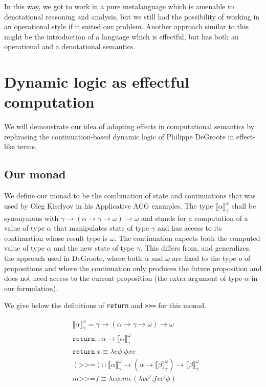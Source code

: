\documentclass{article}
\newcommand{\hsbind}{\mathbin{\texttt{>>=}}}
\newcommand{\statecps}[3]{\llbracket #3 \rrbracket^{#2}_{#1}}
\begin{document}
In this way, we got to work in a pure metalanguage which is amenable to
denotational reasoning and analysis, but we still had the possibility of
working in an operational style if it suited our problem. Another approach
similar to this might be the introduction of a language which is effectful,
but has both an operational and a denotational semantics.


\section{Dynamic logic as effectful computation}

We will demonstrate our idea of adopting effects in computational semantics by
rephrasing the continuation-based dynamic logic of Philippe DeGroote in
effect-like terms.


\subsection{Our monad}

We define our monad to be the combination of state and continuations that was
used by Oleg Kiselyov in his Applicative ACG examples. The type
$\statecps{\gamma}{\omega}{\alpha}$ shall be synonymous with $\gamma \to
(\alpha \to \gamma \to \omega) \to \omega$ and stands for a computation of a
value of type $\alpha$ that manipulates state of type $\gamma$ and has access
to its continuation whose result type is $\omega$. The continuation expects
both the computed value of type $\alpha$ and the new state of type
$\gamma$. This differs from, and generalizes, the approach used in DeGroote,
where both $\alpha$ and $\omega$ are fixed to the type $o$ of propositions and
where the continuation only produces the future proposition and does not need
access to the current proposition (the extra argument of type $\alpha$ in our
formulation).

We give below the definitions of \texttt{return} and \texttt{>>=} for this
monad.

\begin{align*}
& \statecps{\gamma}{\omega}{\alpha} = \gamma \to (\alpha \to \gamma \to \omega) \to \omega \\
& \texttt{return} :: \alpha \to \statecps{\gamma}{\omega}{\alpha} \\
& \texttt{return}\ x \equiv \lambda e \phi. \phi x e \\
& (\texttt{>>=}) :: \statecps{\gamma}{\omega}{\alpha}
    \to (\alpha \to \statecps{\gamma}{\omega}{\beta})
     \to \statecps{\gamma}{\omega}{\beta} \\
& m \hsbind f \equiv \lambda e \phi. m e (\lambda v e'. f v e' \phi)
\end{align*}
\end{document}
